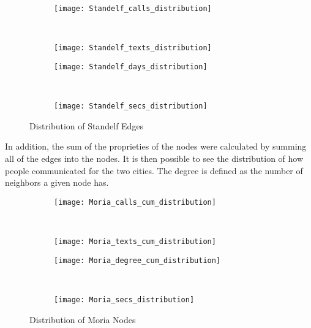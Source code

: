 \begin{figure*}[ht!]
	\centering
	\begin{subfigure}[b]{0.45\textwidth}
		\centering
		\texttt{[image: Standelf\_calls\_distribution]}
	\end{subfigure}%
	~
	\begin{subfigure}[b]{0.45\textwidth}
		\centering
		\texttt{[image: Standelf\_texts\_distribution]}
	\end{subfigure}
	

	\begin{subfigure}[b]{0.45\textwidth}
		\centering
		\texttt{[image: Standelf\_days\_distribution]}
	\end{subfigure}%
	~
	\begin{subfigure}[b]{0.45\textwidth}
		\centering
		\texttt{[image: Standelf\_secs\_distribution]}
	\end{subfigure}
	\caption{Distribution of Standelf Edges}
	\label{fig:StandelfEdgeDist}
\end{figure*}
In addition, the sum of the proprieties of the nodes were calculated by summing all of the edges into the nodes.
It is then possible to see the distribution of how people communicated for the two cities.
The degree is defined as the number of neighbors a given node has.
\begin{figure*}[ht!]
	\centering
	\begin{subfigure}[b]{0.45\textwidth}
		\centering
		\texttt{[image: Moria\_calls\_cum\_distribution]}
	\end{subfigure}%
	~
	\begin{subfigure}[b]{0.45\textwidth}
		\centering
		\texttt{[image: Moria\_texts\_cum\_distribution]}
	\end{subfigure}
	

	\begin{subfigure}[b]{0.45\textwidth}
		\centering
		\texttt{[image: Moria\_degree\_cum\_distribution]}
	\end{subfigure}%
	~
	\begin{subfigure}[b]{0.45\textwidth}
		\centering
		\texttt{[image: Moria\_secs\_distribution]}
	\end{subfigure}
	\caption{Distribution of Moria Nodes}
	\label{fig:MoriaNodeDist}
\end{figure*}
